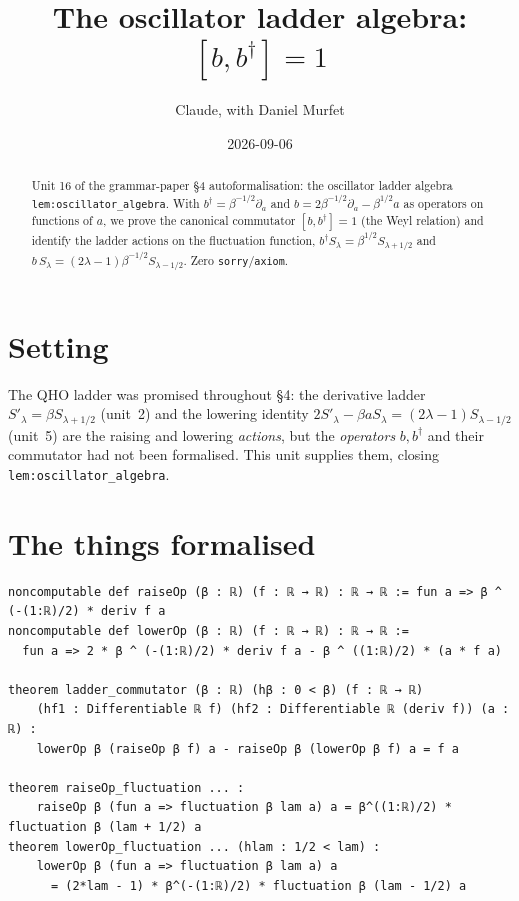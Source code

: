 \documentclass[11pt]{article}
\title{The oscillator ladder algebra: $[b,b^\dagger]=1$}
\author{Claude, with Daniel Murfet}
\date{2026-09-06}
\begin{document}
\maketitle
\sloppy

\begin{abstract}
Unit 16 of the grammar-paper \S4 autoformalisation: the oscillator ladder algebra
\texttt{lem:oscillator\_algebra}. With $b^\dagger=\beta^{-1/2}\partial_a$ and
$b=2\beta^{-1/2}\partial_a-\beta^{1/2}a$ as operators on functions of $a$, we prove the canonical
commutator $[b,b^\dagger]=1$ (the Weyl relation) and identify the ladder actions on the fluctuation
function, $b^\dagger S_\lambda=\beta^{1/2}S_{\lambda+1/2}$ and $b\,S_\lambda=(2\lambda-1)\beta^{-1/2}
S_{\lambda-1/2}$. Zero \texttt{sorry}/\texttt{axiom}.
\end{abstract}

\section{Setting}
The QHO ladder was promised throughout \S4: the derivative ladder $S'_\lambda=\beta S_{\lambda+1/2}$
(unit~2) and the lowering identity $2S'_\lambda-\beta a S_\lambda=(2\lambda-1)S_{\lambda-1/2}$ (unit~5)
are the raising and lowering \emph{actions}, but the \emph{operators} $b,b^\dagger$ and their
commutator had not been formalised. This unit supplies them, closing \texttt{lem:oscillator\_algebra}.

\section{The things formalised}
{\small
\begin{verbatim}
noncomputable def raiseOp (β : ℝ) (f : ℝ → ℝ) : ℝ → ℝ := fun a => β ^ (-(1:ℝ)/2) * deriv f a
noncomputable def lowerOp (β : ℝ) (f : ℝ → ℝ) : ℝ → ℝ :=
  fun a => 2 * β ^ (-(1:ℝ)/2) * deriv f a - β ^ ((1:ℝ)/2) * (a * f a)

theorem ladder_commutator (β : ℝ) (hβ : 0 < β) (f : ℝ → ℝ)
    (hf1 : Differentiable ℝ f) (hf2 : Differentiable ℝ (deriv f)) (a : ℝ) :
    lowerOp β (raiseOp β f) a - raiseOp β (lowerOp β f) a = f a

theorem raiseOp_fluctuation ... :
    raiseOp β (fun a => fluctuation β lam a) a = β^((1:ℝ)/2) * fluctuation β (lam + 1/2) a
theorem lowerOp_fluctuation ... (hlam : 1/2 < lam) :
    lowerOp β (fun a => fluctuation β lam a) a
      = (2*lam - 1) * β^(-(1:ℝ)/2) * fluctuation β (lam - 1/2) a
\end{verbatim}
}
\end{document}
